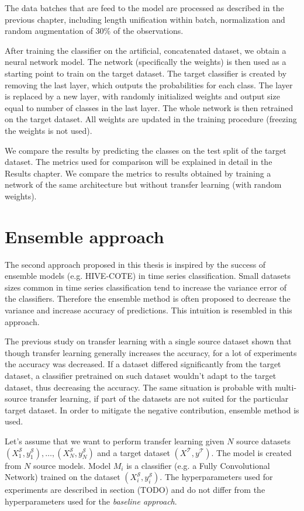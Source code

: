\documentclass[a4paper,11pt,twoside]{report}
\theoremstyle{definition}
\begin{document}
\FloatBarrier
The data batches that are feed to the model are processed as described in the previous chapter, including length unification within batch, normalization and random augmentation of 30\% of the observations.

After training the classifier on the artificial, concatenated dataset, we obtain a neural network model. The network (specifically the weights) is then used as a starting point to train on the target dataset. The target classifier is created by removing the last layer, which outputs the probabilities for each class. The layer is replaced by a new layer, with randomly initialized weights and output size equal to number of classes in the last layer. The whole network is then retrained on the target dataset. All weights are updated in the training procedure (freezing the weights is not used).

We compare the results by predicting the classes on the test split of the target dataset. The metrics used for comparison will be explained in detail in the Results chapter. We compare the metrics to results obtained by training a network of the same architecture but without transfer learning (with random weights).

\section{Ensemble approach}
The second approach proposed in this thesis is inspired by the success of ensemble models (e.g. HIVE-COTE) %
 in time series classification. Small datasets sizes common in time series classification tend to increase the variance error of the classifiers. Therefore the ensemble method is often proposed to decrease the variance and increase accuracy of predictions. This intuition is resembled in this approach.

The previous study on transfer learning with a single source dataset \cite{transfer_learning_time_series} shown that though transfer learning generally increases the accuracy, for a lot of experiments the accuracy was decreased. If a dataset differed significantly from the target dataset, a classifier pretrained on such dataset wouldn't adapt to the target dataset, thus decreasing the accuracy. The same situation is probable with multi-source transfer learning, if part of the datasets are not suited for the particular target dataset. In order to mitigate the negative contribution, ensemble method is used.

Let's assume that we want to perform transfer learning given $N$ source datasets $(X^\mathcal{S}_1, y^\mathcal{S}_1), \dots, (X^\mathcal{S}_N, y^\mathcal{S}_N)$ and a target dataset $(X^\mathcal{T}, y^\mathcal{T})$.
The model is created from $N$ source models. Model $M_i$ is a classifier (e.g. a Fully Convolutional Network) trained on the dataset $(X^\mathcal{S}_i, y^\mathcal{S}_i)$. The hyperparameters used for experiments are described in section (TODO) and do not differ from the hyperparameters used for the \textit{baseline approach}. %
\end{document}
